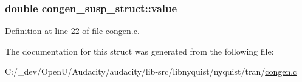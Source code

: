 \subsubsection[{\texorpdfstring{value}{value}}]{\setlength{\rightskip}{0pt plus 5cm}double congen\+\_\+susp\+\_\+struct\+::value}\hypertarget{structcongen__susp__struct_a8c76f6e27d57a8bf69e1b863bd64a7c5}{}\label{structcongen__susp__struct_a8c76f6e27d57a8bf69e1b863bd64a7c5}


Definition at line 22 of file congen.\+c.



The documentation for this struct was generated from the following file\+:\begin{DoxyCompactItemize}
\item 
C\+:/\+\_\+dev/\+Open\+U/\+Audacity/audacity/lib-\/src/libnyquist/nyquist/tran/\hyperlink{congen_8c}{congen.\+c}\end{DoxyCompactItemize}
